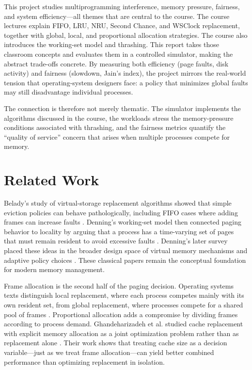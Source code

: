 \documentclass[conference]{IEEEtran}
\begin{document}
This project studies multiprogramming interference, memory pressure, fairness, and system efficiency---all themes that are central to the course. The course lectures explain FIFO, LRU, NRU, Second Chance, and WSClock replacement, together with global, local, and proportional allocation strategies. The course also introduces the working-set model and thrashing. This report takes those classroom concepts and evaluates them in a controlled simulator, making the abstract trade-offs concrete. By measuring both efficiency (page faults, disk activity) and fairness (slowdown, Jain's index), the project mirrors the real-world tension that operating-system designers face: a policy that minimizes global faults may still disadvantage individual processes.

The connection is therefore not merely thematic. The simulator implements the algorithms discussed in the course, the workloads stress the memory-pressure conditions associated with thrashing, and the fairness metrics quantify the ``quality of service'' concern that arises when multiple processes compete for memory.

\section{Related Work}
Belady's study of virtual-storage replacement algorithms showed that simple eviction policies can behave pathologically, including FIFO cases where adding frames can increase faults \cite{Belady1966}. Denning's working-set model then connected paging behavior to locality by arguing that a process has a time-varying set of pages that must remain resident to avoid excessive faults \cite{Denning1968}. Denning's later survey placed these ideas in the broader design space of virtual memory mechanisms and adaptive policy choices \cite{Denning1970}. These classical papers remain the conceptual foundation for modern memory management.

Frame allocation is the second half of the paging decision. Operating systems texts distinguish local replacement, where each process competes mainly with its own resident set, from global replacement, where processes compete for a shared pool of frames \cite{Silberschatz2019}. Proportional allocation adds a compromise by dividing frames according to process demand. Ghandeharizadeh et al. studied cache replacement with explicit memory allocation as a joint optimization problem rather than as replacement alone \cite{Ghandeharizadeh2015}. Their work shows that treating cache size as a decision variable---just as we treat frame allocation---can yield better combined performance than optimizing replacement in isolation.
\end{document}
